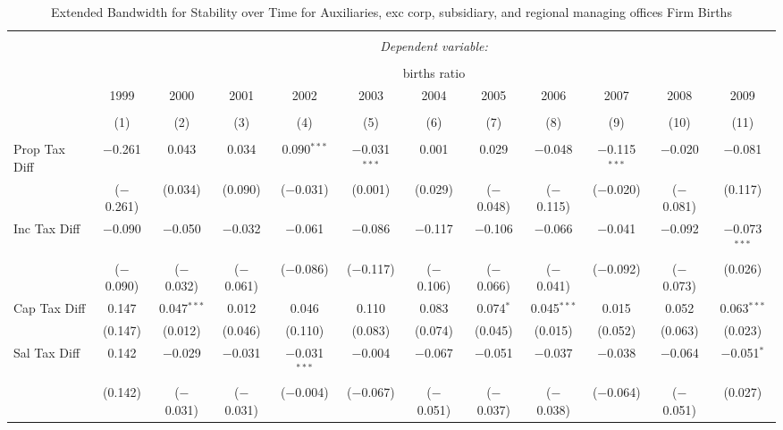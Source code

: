 
\begin{table}[!htbp] \centering 
  \caption{Extended Bandwidth for Stability over Time for  Auxiliaries, exc corp, subsidiary, and regional managing offices Firm Births} 
  \label{95year} 
\small 
\begin{tabular}{@{\extracolsep{5pt}}lccccccccccc} 
\\[-1.8ex]\hline 
\hline \\[-1.8ex] 
 & \multicolumn{11}{c}{\textit{Dependent variable:}} \\ 
\cline{2-12} 
\\[-1.8ex] & \multicolumn{11}{c}{births ratio} \\ 
 & 1999 & 2000 & 2001 & 2002 & 2003 & 2004 & 2005 & 2006 & 2007 & 2008 & 2009 \\ 
\\[-1.8ex] & (1) & (2) & (3) & (4) & (5) & (6) & (7) & (8) & (9) & (10) & (11)\\ 
\hline \\[-1.8ex] 
 Prop Tax Diff & $-$0.261 & 0.043 & 0.034 & 0.090$^{***}$ & $-$0.031$^{***}$ & 0.001 & 0.029 & $-$0.048 & $-$0.115$^{***}$ & $-$0.020 & $-$0.081 \\ 
  & ($-$0.261) & (0.034) & (0.090) & ($-$0.031) & (0.001) & (0.029) & ($-$0.048) & ($-$0.115) & ($-$0.020) & ($-$0.081) & (0.117) \\ 
  Inc Tax Diff & $-$0.090 & $-$0.050 & $-$0.032 & $-$0.061 & $-$0.086 & $-$0.117 & $-$0.106 & $-$0.066 & $-$0.041 & $-$0.092 & $-$0.073$^{***}$ \\ 
  & ($-$0.090) & ($-$0.032) & ($-$0.061) & ($-$0.086) & ($-$0.117) & ($-$0.106) & ($-$0.066) & ($-$0.041) & ($-$0.092) & ($-$0.073) & (0.026) \\ 
  Cap Tax Diff & 0.147 & 0.047$^{***}$ & 0.012 & 0.046 & 0.110 & 0.083 & 0.074$^{*}$ & 0.045$^{***}$ & 0.015 & 0.052 & 0.063$^{***}$ \\ 
  & (0.147) & (0.012) & (0.046) & (0.110) & (0.083) & (0.074) & (0.045) & (0.015) & (0.052) & (0.063) & (0.023) \\ 
  Sal Tax Diff & 0.142 & $-$0.029 & $-$0.031 & $-$0.031$^{***}$ & $-$0.004 & $-$0.067 & $-$0.051 & $-$0.037 & $-$0.038 & $-$0.064 & $-$0.051$^{*}$ \\ 
  & (0.142) & ($-$0.031) & ($-$0.031) & ($-$0.004) & ($-$0.067) & ($-$0.051) & ($-$0.037) & ($-$0.038) & ($-$0.064) & ($-$0.051) & (0.027) \\ 

\end{tabular}
\end{table}
